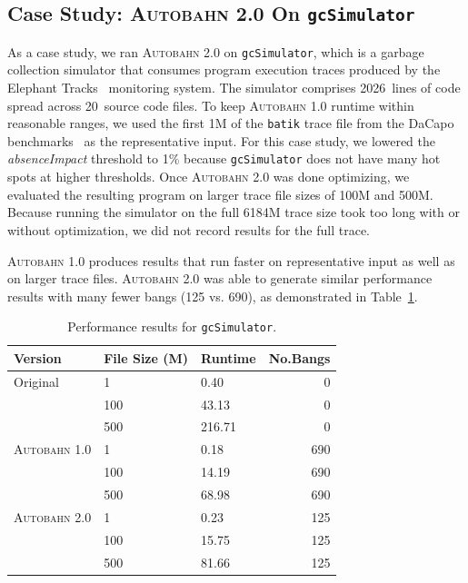 \documentclass[format=sigplan, review=true]{acmart}
\newcommand{\tblref}[1]{Table~\ref{#1}}
\newcommand{\hotspots}[0]{hot spots}
\newcommand{\Ao}[0]{\textsc{Autobahn 1.0}}
\newcommand{\At}[0]{\textsc{Autobahn 2.0}}
\newcommand{\absim}[0]{\textit{absenceImpact}}
\begin{document}
\subsection{Case Study: \At{} On \texttt{gcSimulator}}
As a case study, we ran \At{} on \texttt{gcSimulator}, which is a
garbage collection simulator that consumes program execution traces
produced by the Elephant Tracks~\cite{Ricci13} monitoring system.  The
simulator comprises 2026~lines of code spread across 20~source code
files.  To keep \Ao{} runtime within reasonable ranges, we used the
first 1M of the \texttt{batik} trace file from the DaCapo
benchmarks~\cite{Blackburn06} as the representative input.  For this
case study, we lowered the \absim{} threshold to 1\%
because \texttt{gcSimulator} does not have many \hotspots{} at higher
thresholds.  Once \At{} was done optimizing, we evaluated the
resulting program on larger trace file sizes of 100M and 500M. Because
running the simulator on the full 6184M trace size took too
long with or without optimization, we did not record results for the
full trace.

\Ao{} produces results that run
faster on representative input as well as on larger trace files.
\At{} was  able to generate similar performance results with many fewer
bangs (125 vs. 690), as demonstrated in \tblref{tab:gc}.

\begin{table}
\begin{tabular}{lllr}
\hline
Version   & File Size (M) & Runtime & No.Bangs \\
\hline
Original      & 1   &   0.40	 & 0   \\
          & 100        & 43.13      & 0 \\
       & 500     &  216.71 & 0 \\
\Ao{}       & 1     & 0.18    &  690\\
          & 100        & 14.19 &  690\\
                 & 500        & 68.98	& 690\\
\At{}      & 1   &  0.23 & 125    \\
          & 100        & 15.75 & 125      \\
       & 500    & 81.66 & 125    \\

\hline
\end{tabular}
\caption{Performance results for \texttt{gcSimulator}.}
\label{tab:gc}
\end{table}
\end{document}
